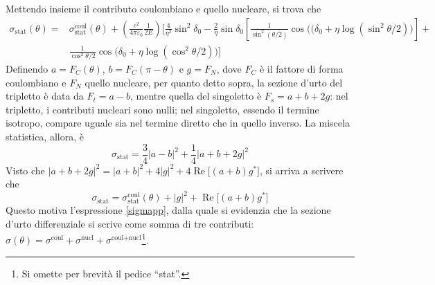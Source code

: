 \documentclass[11pt, a4paper]{scrartcl}
\theoremstyle{style}
\numberwithin{equation}{subsection}
\begin{document}
\noindent Mettendo insieme il contributo coulombiano e quello nucleare, si trova che 
\begin{equation}\label{sigmapp}
\begin{split}
	\sigma _\text{stat}(\theta )  ={ } &{ } \sigma _\text{stat}^\text{coul}(\theta ) + \left(\frac{e^2}{4\pi \varepsilon _0}\frac{1}{2E}\right) \Bigg[ \frac{4}{ \eta ^2} \sin^2 \delta _0 - \frac{2}{\eta }\sin \delta _0 \left[ \frac{1}{\sin^2 ( \theta  / 2)} \cos\Big((\delta _0 + \eta \log(\sin^2 \theta  / 2)\Big) \right] + { }   \\
				       & { } \frac{1}{\cos^2 \theta  / 2} \cos \Big( \delta _0 + \eta  \log (\cos^2 \theta  / 2)\Big)\Bigg]
\end{split}
\end{equation}
Definendo $a = F_C(\theta )$, $b = F_C(\pi-\theta )$ e $g = F_N$, dove $F_C$ \`e il fattore di forma coulombiano e $F_N$ quello nucleare, per quanto detto sopra, la sezione d'urto del tripletto \`e data da $F_t = a - b$, mentre quella del singoletto \`e $F_s = a + b +2g$: nel tripletto, i contributi nucleari sono nulli; nel singoletto, essendo il termine isotropo, compare uguale sia nel termine diretto che in quello inverso. 
La miscela statistica, allora, \`e
\[
\sigma _\text{stat}=\frac{3}{4} \lvert a-b \rvert ^2 + \frac{1}{4}\lvert a+b+2g \rvert ^2
\] 
Visto che $\lvert a+ b + 2g \rvert^2 = \lvert a+b \rvert ^2 + 4 \lvert g \rvert ^2 + 4 \operatorname{Re} \big[(a+b)g^*\big] $, si arriva a scrivere che 
\[
\sigma _\text{stat} = \sigma _\text{stat}^\text{coul}(\theta ) + \lvert g \rvert ^2 + \operatorname{Re}  \big[ (a+b)g^* \big] 
\] 
Questo motiva l'espressione \ref{sigmapp}, dalla quale si evidenzia che la sezione d'urto differenziale si scrive come somma di tre contributi: $\sigma (\theta ) = \sigma ^\text{coul} + \sigma ^\text{nucl}+\sigma ^\text{coul+nucl}$\footnote{Si omette per brevit\`a il pedice ``stat''.}.
\end{document}
